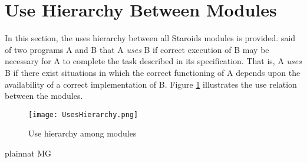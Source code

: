 \documentclass[12pt, titlepage]{article}
\begin{document}
\section{Use Hierarchy Between Modules} \label{SecUse}

In this section, the uses hierarchy between all Staroids modules is provided. \citet{Parnas1978} said of two programs A and B that A {\em uses} B if correct execution of B may be necessary for A to complete the task described in its specification. That is, A {\em uses} B if there exist situations in which the correct functioning of A depends upon the availability of a correct implementation of B.  Figure \ref{FigUH} illustrates the use relation between the modules.


\begin{figure}[H]
\centering
\texttt{[image: UsesHierarchy.png]}
\caption{Use hierarchy among modules}
\label{FigUH}
\end{figure}


 {plainnat}
 {MG}
\end{document}
